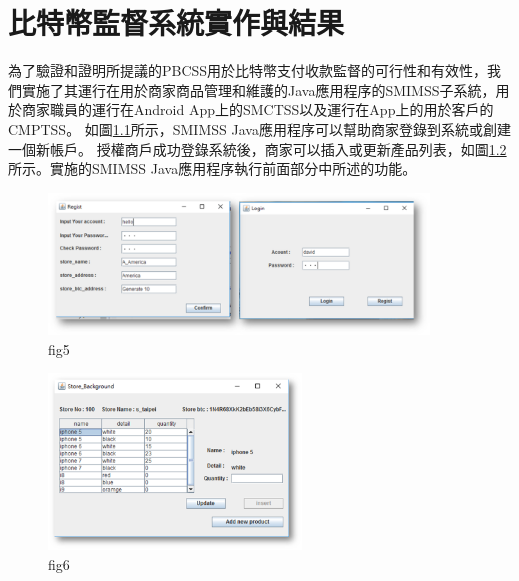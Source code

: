 
\chapter{比特幣監督系統實作與結果}
為了驗證和證明所提議的PBCSS用於比特幣支付收款監督的可行性和有效性，我們實施了其運行在用於商家商品管理和維護的Java應用程序的SMIMSS子系統，用於商家職員的運行在Android App上的SMCTSS以及運行在App上的用於客戶的CMPTSS。
如圖\ref{fig5}所示，SMIMSS Java應用程序可以幫助商家登錄到系統或創建一個新帳戶。 授權商戶成功登錄系統後，商家可以插入或更新產品列表，如圖\ref{fig6}所示。實施的SMIMSS Java應用程序執行前面部分中所述的功能。
\begin{figure}[h]
	\centering
	\includegraphics[width = 0.9\textwidth]{fig5.png}
	\caption{fig5}\label{fig5}
\end{figure}
\begin{figure}[h]
	\centering
	\includegraphics[width = 0.6\textwidth]{fig6.png}
	\caption{fig6}\label{fig6}
\end{figure}

